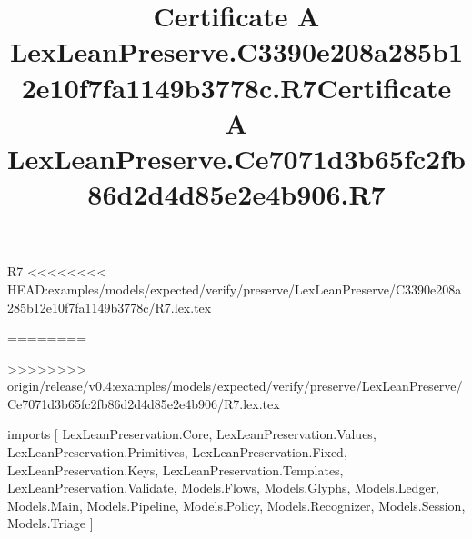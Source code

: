 \begin{lexlean}{R7}
<<<<<<<< HEAD:examples/models/expected/verify/preserve/LexLeanPreserve/C3390e208a285b12e10f7fa1149b3778c/R7.lex.tex
\title{Certificate A LexLeanPreserve.C3390e208a285b12e10f7fa1149b3778c.R7}
========
\title{Certificate A LexLeanPreserve.Ce7071d3b65fc2fb86d2d4d85e2e4b906.R7}
>>>>>>>> origin/release/v0.4:examples/models/expected/verify/preserve/LexLeanPreserve/Ce7071d3b65fc2fb86d2d4d85e2e4b906/R7.lex.tex
\begin{coremodule}
imports [
  LexLeanPreservation.Core,
  LexLeanPreservation.Values,
  LexLeanPreservation.Primitives,
  LexLeanPreservation.Fixed,
  LexLeanPreservation.Keys,
  LexLeanPreservation.Templates,
  LexLeanPreservation.Validate,
  Models.Flows,
  Models.Glyphs,
  Models.Ledger,
  Models.Main,
  Models.Pipeline,
  Models.Policy,
  Models.Recognizer,
  Models.Session,
  Models.Triage
]


\end{coremodule}
\end{lexlean}
